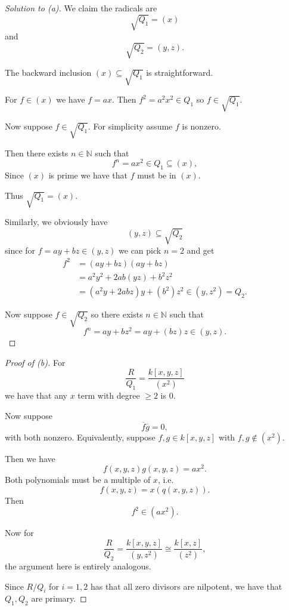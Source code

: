 \documentclass[11pt]{article}
\begin{document}
\begin{proof}[Solution to (a)]
    We claim the radicals are 
    \[
        \sqrt{Q_1} = (x) 
    \]
    and 
    \[
        \sqrt{Q_2} = (y,z). 
    \]

    The backward inclusion $(x) \subseteq 
    \sqrt{Q_1}$ is straightforward.

    For $f \in (x)$ we have $f = ax$. 
    Then $f^2 = a^2x^2 \in Q_1$ so 
    $f \in \sqrt{Q_1}$. 

    Now suppose $f \in \sqrt{Q_1}$. 
    For simplicity assume $f$ is nonzero. 

    Then there exists $n \in \mathbb N$ such that 
    \[
        f^n = ax^2 \in Q_1 \subseteq (x), 
    \]
    Since $(x)$ is prime we have that 
    $f$ must be in $(x)$. 

    Thus $\sqrt{Q_1} = (x)$. 

    Similarly, we obviously have 
    \[
        (y,z) \subseteq \sqrt{Q_2}  
    \]
    since for $f = ay + bz \in (y,z)$ we can 
    pick $n=2$ and get 
    \begin{align*}
        f^2 &= (ay+bz)(ay+bz) \\ 
        &= a^2y^2 + 2ab(yz) + b^2z^2 \\ 
        &= (a^2y + 2abz)y + (b^2)z^2 \in (y,z^2) = Q_2.  
    \end{align*}

    Now suppose $f \in \sqrt{Q_2}$ so there 
    exists $n \in \mathbb N$ such that 
    \[
        f^n = ay + bz^2 = ay + (bz)z \in (y,z). 
    \]
\end{proof}
\begin{proof}[Proof of (b)]
    For
    \[
        \frac{R}{Q_1} 
        = \frac{k[x,y,z]}{(x^2)}
    \]
    we have that any $x$ term 
    with degree $\geq 2$ is $0$. 
    
    Now suppose 
    \[
        \overline f \overline g = 0, 
    \]
    with both nonzero. 
    Equivalently, 
    suppose 
    $f,g \in k[x,y,z]$ with $f,g \not\in (x^2)$. 

    Then we have 
    \[
        f(x,y,z)g(x,y,z) = ax^2. 
    \]
    Both polynomials must 
    be a multiple of $x$, i.e.  
    \[
        f(x,y,z) = x(q(x,y,z)). 
    \] 
    Then 
    \[
        f^2 \in (ax^2). 
    \]

    Now for 
    \[
        \frac{R}{Q_2} 
        = \frac{k[x,y,z]}{(y,z^2)} 
        \cong \frac{k[x,z]}{(z^2)},
    \]    
    the argument here is entirely analogous. 

    Since $R/Q_i$ for $i = 1,2$ has that 
    all zero divisors are nilpotent, 
    we have that $Q_1,Q_2$ are primary. 
\end{proof}
\end{document}

